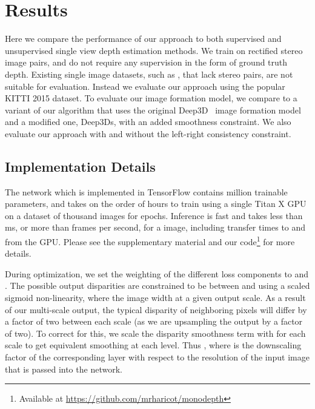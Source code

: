 \documentclass[10pt,twocolumn,letterpaper]{article}
\begin{document}
\section{Results}
Here we compare the performance of our approach to both supervised and unsupervised single view depth estimation methods. 
We train on rectified stereo image pairs, and do not require any supervision in the form of ground truth depth.
Existing single image datasets, such as \cite{Silberman:ECCV12, saxena2009make3d}, that lack stereo pairs, are not suitable for evaluation.
Instead we evaluate our approach using the popular KITTI 2015 \cite{Geiger2012CVPR} dataset.
To evaluate our image formation model, we compare to a variant of our algorithm that uses the original Deep3D~\cite{xie2016deep3d} image formation model and a modified one, Deep3Ds, with an added smoothness constraint. 
We also evaluate our approach with and without the left-right consistency constraint.

\subsection{Implementation Details}
The network which is implemented in TensorFlow \cite{tensorflow} contains  million trainable parameters, and takes on the order of  hours to train using a single Titan X GPU on a dataset of  thousand images for  epochs. 
Inference is fast and takes less than  ms, or more than  frames per second, for a  image, including transfer times to and from the GPU. Please see the supplementary material and our code\footnote{Available at \url{https://github.com/mrharicot/monodepth}} for more details.

During optimization, we set the weighting of the different loss components to  and . 
The possible output disparities are constrained to be between  and  using a scaled sigmoid non-linearity, where  the image width at a given output scale. 
As a result of our multi-scale output, the typical disparity of neighboring pixels will differ by a factor of two between each scale (as we are upsampling the output by a factor of two). 
To correct for this, we scale the disparity smoothness term  with  for each scale to get equivalent smoothing at each level. 
Thus , where  is the downscaling factor of the corresponding layer with respect to the resolution of the input image that is passed into the network.
\end{document}
